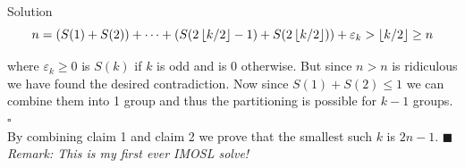 \documentclass{article}
\begin{document}
\begin{solution}{Solution}
$$
n = (S(1) + S(2)) + \cdots + (S(2\left\lfloor k/2 \right\rfloor-1) +
S(2\left\lfloor k/2 \right\rfloor)) + \varepsilon_k > \left\lfloor k/2 \right\rfloor \geq n
$$

where $\varepsilon_k \geq 0$ is $S(k)$ if $k$ is odd and is 0 otherwise.
But since $n > n$ is ridiculous we have found the
desired contradiction. Now since $S(1) + S(2) \leq 1$ we can
combine them into 1 group and thus the partitioning is possible for $k-1$
groups. $\square$
\\

By combining claim 1 and claim 2 we prove that the smallest such $k$ is
$2n-1$. $\blacksquare$ \\

\textit{Remark: This is my first ever IMOSL solve!}
\end{solution}
\end{document}
